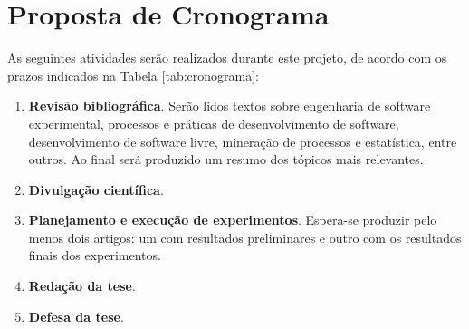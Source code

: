 \documentclass{article}
\begin{document}

\section{Proposta de Cronograma}

As seguintes atividades serão realizados durante este projeto, de acordo com os
prazos indicados na Tabela \ref{tab:cronograma}:

\begin{enumerate}
  \item \label{prevista:estudos}
    \textbf{Revisão bibliográfica}. Serão lidos textos sobre engenharia de software
    experimental, processos e práticas de desenvolvimento de software,
    desenvolvimento de software livre, mineração de processos e estatística,
    entre outros. Ao final será produzido um resumo dos tópicos mais relevantes.
  \item \label{prevista:artigos}
    \textbf{Divulgação científica}.
  \item \label{prevista:experimentos}
    \textbf{Planejamento e execução de experimentos}. Espera-se produzir pelo menos dois
    artigos: um com resultados preliminares e outro com os resultados finais dos
    experimentos.
  \item \label{prevista:redacao}
    \textbf{Redação da tese}.
  \item \label{prevista:defesa}
    \textbf{Defesa da tese}.
\end{enumerate}
\end{document}
